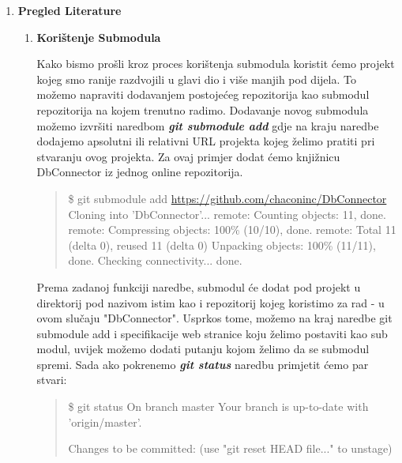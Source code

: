 \documentclass {article}
\begin{document}
\begin{enumerate}
    \item \textbf{Pregled Literature}
        \begin{enumerate}
            \item \textbf{Korištenje Submodula}
  

Kako bismo prošli kroz proces korištenja submodula koristit ćemo projekt kojeg smo ranije razdvojili u glavi dio i više manjih pod dijela.
\newline
To možemo napraviti dodavanjem postojećeg repozitorija kao submodul repozitorija na kojem trenutno radimo.
\newline
Dodavanje novog submodula možemo izvršiti naredbom \textbf{\emph{git submodule add}} gdje na kraju naredbe dodajemo apsolutni ili relativni URL projekta kojeg želimo pratiti pri stvaranju ovog projekta. Za ovaj primjer dodat ćemo knjižnicu DbConnector iz jednog online repozitorija.

\begin{quote}
   \$ git submodule add \url{https://github.com/chaconinc/DbConnector}
    \newline Cloning into 'DbConnector'...
    \newline remote: Counting objects: 11, done.
    \newline remote: Compressing objects: 100\% (10/10), done.
    \newline remote: Total 11 (delta 0), reused 11 (delta 0)
    \newline Unpacking objects: 100\% (11/11), done.
    \newline Checking connectivity... done.

\end{quote}

Prema zadanoj funkciji naredbe, submodul će dodat pod projekt u direktorij pod nazivom istim kao i repozitorij kojeg koristimo za rad - u ovom slučaju "DbConnector". Usprkos tome, možemo na kraj naredbe git submodule add i specifikacije web stranice koju želimo postaviti kao sub modul, uvijek možemo dodati putanju kojom želimo da se submodul spremi.
\newline
\newline
Sada ako pokrenemo \textbf{\emph{git status}} naredbu primjetit ćemo par stvari:

\begin{quote}
\$ git status
On branch master
Your branch is up-to-date with 'origin/master'.

Changes to be committed:
  \newline(use "git reset HEAD file..." to unstage)


\end{quote}
\end{enumerate}
\end{enumerate}
\end{document}
